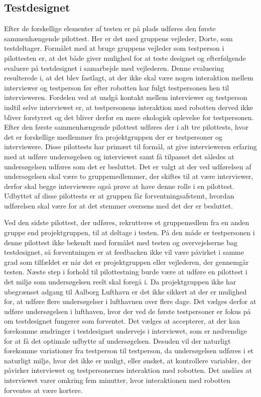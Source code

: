\subsection{Testdesignet}
\label{ParametrePilotTestdesign}
%
Efter de forskellige elementer af testen er på plads udføres den første sammenhængende pilottest. Her er det med gruppens vejleder, Dorte, som testdeltager. Formålet med at bruge gruppens vejleder som testperson i pilottesten er, at det både giver mulighed for at teste designet og efterfølgende evaluere på testdesignet i samarbejde med vejlederen. Denne evaluering resulterede i, at det blev fastlagt, at der ikke skal være nogen interaktion mellem interviewer og testperson før efter robotten har fulgt testpersonen hen til intervieweren. Fordelen ved at undgå kontakt mellem interviewer og testperson indtil selve interviewet er, at testpersonens interaktion med robotten derved ikke bliver forstyrret og det bliver derfor en mere økologisk oplevelse for testpersonen. \blankline
%
Efter den første sammenhængende pilottest udføres der i alt tre pilottests, hvor det er forskellige medlemmer fra projektgruppen der er testpersoner og interviewere. Disse pilottests har primært til formål, at give intervieweren erfaring med at udføre undersøgelsen og interviewet samt få tilpasset det således at undersøgelsen udføres som det er besluttet. Det er valgt at der ved udførelsen af undersøgelsen skal være to gruppemedlemmer, der skiftes til at være interviewer, derfor skal begge interviewere også prøve at have denne rolle i en pilottest. Udbyttet af disse pilottests er at gruppen får forventningsafstemt, hvordan udførelsen skal være for at det stemmer oversens med det der er besluttet.

Ved den sidste pilottest, der udføres, rekrutteres et gruppemedlem fra en anden gruppe end projektgruppen, til at deltage i testen. På den måde er testpersonen i denne pilottest ikke bekendt med formålet med testen og overvejelserne bag testdesignet, så forventningen er at feedbacken ikke vil være påvirket i samme grad som tilfældet er når det er projektgruppen eller vejlederen, der gennemgår testen. \blankline
%
Næste step i forhold til pilottestning burde være at udføre en pilottest i det miljø som undersøgelsen reelt skal foregå i. Da projektgruppen ikke har ubegrænset adgang til Aalborg Lufthavn er det ikke sikkert at der er mulighed for, at udføre flere undersøgelser i lufthavnen over flere dage. Det vælges derfor at udføre undersøgelsen i lufthaven, hvor der ved de første testpersoner er fokus på om testdesignet fungerer som forventet. Det vælges at accepterer, at der kan forekomme ændringer i testdesignet undervejs i interviewet, som er nødvendige for at få det optimale udbytte af undersøgelsen. Desuden vil der naturligt forekomme variationer fra testperson til testperson, da undersøgelsen udføres i et naturligt miljø, hvor det ikke er muligt, eller ønsket, at kontrollere variabler, der påvirker interviewet og testpersonernes interaktion med robotten. Det anslåes at interviewet varer omkring fem minutter, hvor interaktionen med robotten forventes at være kortere. 
